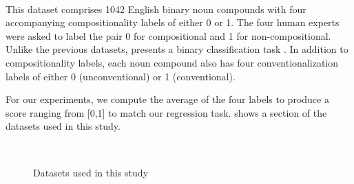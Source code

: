 \paragraph{\farahm}
This dataset comprises 1042 English binary noun compounds with four accompanying compositionality labels of either 0 or 1. The four human experts were asked to label the pair 0 for compositional and 1 for non-compositional. Unlike the previous datasets, \farahm presents a binary classification task \citep{Farah2015c}. In addition to compositionality labels, each noun compound also has four conventionalization labels of either 0 (unconventional) or 1 (conventional). 

\noindent
For our experiments, we compute the average of the four labels to produce a score ranging from [0,1] to match our regression task.  shows a section of the datasets used in this study.
\begin{figure}[h!]
\begin{center}
      \\
    \caption{Datasets used in this study}
    \label{fig:datasets}
\end{center}
\end{figure}

